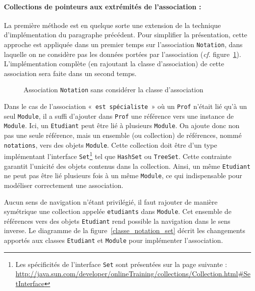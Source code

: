 \documentclass[a4paper,11pt]{article}
\begin{document}
\paragraph{Collections de pointeurs aux extrémités de l'association :}
La première méthode est en quelque sorte une extension de la technique 
d'implémentation du paragraphe précédent. Pour simplifier la présentation, cette approche est 
appliquée dans un premier temps sur l'association \texttt{Notation}, dans laquelle on ne considère pas les 
données portées par l'association (\emph{cf.} figure~\ref{uml_notation1}). L'implémentation complète (en 
rajoutant la classe d'association) de cette association sera faite dans un second temps.

\begin{figure}\centering
{}
\caption{Association \texttt{Notation} sans considérer la classe d'association\label{uml_notation1}}
\end{figure}

Dans le cas de l'association «~\texttt{est spécialiste}~» où un \texttt{Prof} n'était lié qu'à un seul
\texttt{Module}, il a suffi d'ajouter dans \texttt{Prof} une référence vers une instance de
\texttt{Module}. Ici, un \texttt{Etudiant} peut être lié à plusieurs \texttt{Module}. On ajoute donc non pas 
une seule référence, mais un ensemble (ou collection) de références, nommé \texttt{notations}, vers des objets \texttt{Module}. 
Cette collection doit être d'un type implémentant l'interface \texttt{Set}\footnote{Les spécificités de 
l'interface \texttt{Set} sont présentées sur la page suivante : 
\url{http://java.sun.com/developer/onlineTraining/collections/Collection.html\#SetInterface}} tel que
\texttt{HashSet} ou \texttt{TreeSet}. Cette contrainte garantit l'unicité des objets contenus dans la collection. 
Ainsi, un même \texttt{Etudiant} ne peut pas être lié plusieurs fois à un même \texttt{Module}, ce
qui indispensable pour modéliser correctement une association.

Aucun sens de navigation n'étant privilégié, il faut rajouter de manière symétrique une collection appelée 
\texttt{etudiants} dans \texttt{Module}. Cet ensemble de références vers des objets \texttt{Etudiant} rend 
possible la navigation dans le sens inverse. Le diagramme de la figure~\ref{classe_notation_set} décrit 
les changements apportés aux classes \texttt{Etudiant} et \texttt{Module} pour implémenter l'association.
\end{document}
